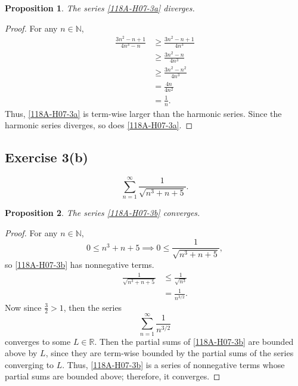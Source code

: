 \documentclass[12pt]{article}
\newtheorem{proposition}{Proposition}
\newenvironment{problem}
    {\begin{lrbox}{\mybox}\begin{minipage}{0.98\textwidth}}
    {\end{minipage}\end{lrbox}\framebox[\textwidth]{\usebox{\mybox}}}
\newcommand{\N}{\mathbb{N}} %
\newcommand{\R}{\mathbb{R}} %
\newcommand{\<}{\left\langle} %
\renewcommand{\>}{\right\rangle} %
\begin{document}
\begin{proposition}
    The series \eqref{118A-H07-3a} diverges.
\end{proposition}

\begin{proof}
    For any $n\in\N$,
    \begin{align*}
        \frac{3n^2-n+1}{4n^3-n}
            &\geq \frac{3n^2-n+1}{4n^3} \\[1em]
            &\geq \frac{3n^2-n}{4n^3} \\[1em]
            &\geq \frac{3n^2-n^2}{4n^3} \\[1em]
            &= \frac{4n}{4n^2} \\[1em]
            &= \frac{1}{n}.
    \end{align*}
    Thus, \eqref{118A-H07-3a} is term-wise larger than the harmonic series. Since the harmonic series diverges, so does \eqref{118A-H07-3a}.
    
\end{proof}

\newpage
\subsection*{Exercise 3(b)}
\begin{problem}
    \begin{equation}\label{118A-H07-3b}
        \sum_{n=1}^\infty \frac{1}{\sqrt{n^3+n+5}}.
    \end{equation}
\end{problem}

\begin{proposition}
    The series \eqref{118A-H07-3b} converges.
\end{proposition}

\begin{proof}
    For any $n\in\N$,
    \[0\leq n^3 + n + 5 \implies 0\leq \frac{1}{\sqrt{n^3+n+5}},\]
    so \eqref{118A-H07-3b} has nonnegative terms.
    \begin{align*}
        \frac{1}{\sqrt{n^3+n+5}}
            &\leq \frac{1}{\sqrt{n^3}} \\
            &= \frac1{n^{3/2}}.
    \end{align*}
    Now since $\frac32 > 1$, then the series
    \[\sum_{n=1}^\infty \frac1{n^{3/2}}\]
    converges to some $L\in\R$. Then the partial sums of \eqref{118A-H07-3b} are bounded above by $L$, since they are term-wise bounded by the partial sums of the series converging to $L$. Thus, \eqref{118A-H07-3b} is a series of nonnegative terms whose partial sums are bounded above; therefore, it converges.
    
\end{proof}
\end{document}
